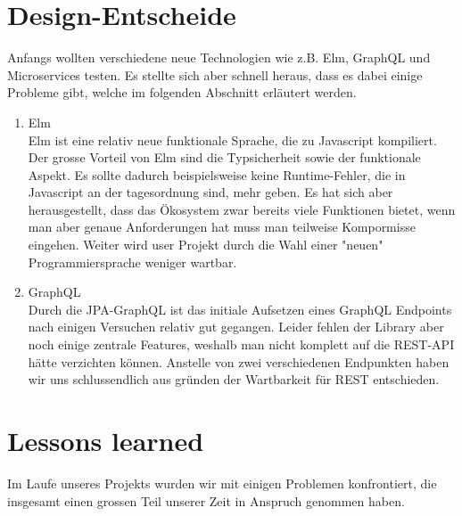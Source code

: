 \documentclass[11pt]{article} %
\begin{document}
\newpage
\section{Design-Entscheide}
Anfangs wollten verschiedene neue Technologien wie z.B. Elm, GraphQL und Microservices testen. Es stellte sich aber schnell heraus, dass es dabei einige Probleme gibt, welche im folgenden Abschnitt erläutert werden.

\begin{enumerate}
\item Elm\\
Elm ist eine relativ neue funktionale Sprache, die zu Javascript kompiliert. Der grosse Vorteil von Elm sind die Typsicherheit sowie der funktionale Aspekt. Es sollte dadurch beispielsweise keine Runtime-Fehler, die in Javascript an der tagesordnung sind, mehr geben.
Es hat sich aber herausgestellt, dass das Ökosystem zwar bereits viele Funktionen bietet, wenn man aber genaue Anforderungen hat muss man teilweise Kompormisse eingehen.
Weiter wird user Projekt durch die Wahl einer "neuen" Programmiersprache weniger wartbar.
\item GraphQL\\
Durch die JPA-GraphQL ist das initiale Aufsetzen eines GraphQL Endpoints nach einigen Versuchen relativ gut gegangen. Leider fehlen der Library aber noch einige zentrale Features, weshalb man nicht komplett auf die REST-API hätte verzichten können. Anstelle von zwei verschiedenen Endpunkten haben wir uns schlussendlich aus gründen der Wartbarkeit für REST entschieden.
\end{enumerate}

\newpage
\section{Lessons learned}
Im Laufe unseres Projekts wurden wir mit einigen Problemen konfrontiert, die insgesamt einen grossen Teil unserer Zeit in Anspruch genommen haben.
\end{document}
